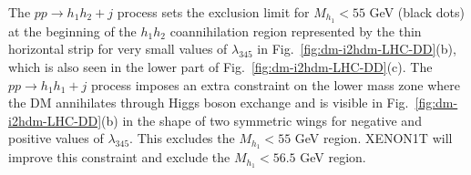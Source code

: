 The $pp \to h_1h_2+j$ process sets the exclusion limit for $M_{h_1}<55$ GeV (black dots) at the beginning of the $h_1 h_2$ coannihilation region represented by the thin horizontal strip for very small values of $\lambda_{345}$ in Fig.~\ref{fig:dm-i2hdm-LHC-DD}(b), which is also seen in the lower part of Fig.~\ref{fig:dm-i2hdm-LHC-DD}(c). The $pp \to h_1 h_1 + j$ process imposes an extra constraint on the lower mass zone where the DM annihilates through Higgs boson exchange and is visible in Fig.~\ref{fig:dm-i2hdm-LHC-DD}(b) in the shape of two symmetric wings for negative and positive values of $\lambda_{345}$. This excludes the $M_{h_1}<55$ GeV region. XENON1T will improve this constraint and exclude the $M_{h_1}<56.5$ GeV region.